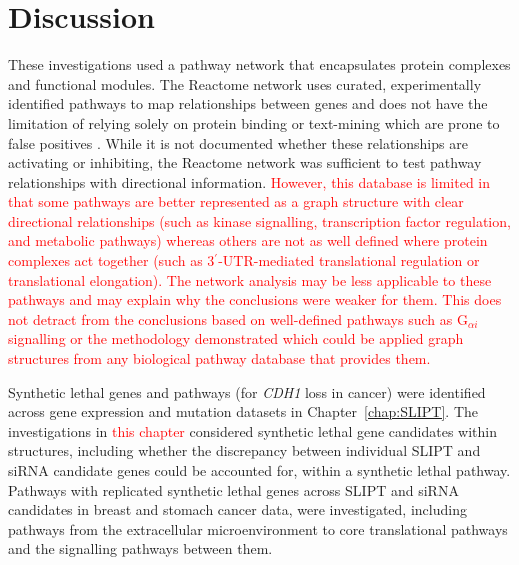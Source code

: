 \FloatBarrier

\section{Discussion}

These investigations used a \gls{pathway} network that encapsulates protein complexes and functional modules. The Reactome network uses curated, experimentally identified \glspl{pathway} to map relationships between genes and does not have the limitation of relying solely on protein binding or text-mining which are prone to false positives \citep{Reactome}. While it is not documented whether these relationships are activating or inhibiting, the Reactome network \citep{Reactome} was sufficient to test \gls{pathway} relationships with directional information.
\textcolor{red}{
However, this database is limited in that some pathways are better represented as a graph structure with clear directional relationships (such as kinase signalling, transcription factor regulation, and metabolic pathways) whereas others are not as well defined where protein complexes act together (such as 3$^\prime$-UTR-mediated translational regulation or translational elongation). The network analysis may be less applicable to these pathways and may explain why the conclusions were weaker for them. This does not detract from the conclusions based on well-defined pathways such as G$_{\alpha i}$ signalling or the methodology demonstrated which could be applied graph structures from any biological pathway database that provides them.
}

Synthetic lethal genes and \glspl{pathway} (for \textit{CDH1} loss in cancer) were identified across \gls{gene expression} and \gls{mutation} datasets in Chapter~\ref{chap:SLIPT}.
The investigations in \textcolor{red}{this chapter} considered \gls{synthetic lethal} gene candidates within  structures, including whether the discrepancy between individual \gls{SLIPT} and \gls{siRNA} candidate genes could be accounted for, within a \gls{synthetic lethal} \gls{pathway}.
%
Pathways with replicated \gls{synthetic lethal} genes across \gls{SLIPT} and \gls{siRNA} candidates in breast and stomach cancer data, were investigated, including \glspl{pathway} from the extracellular microenvironment to core translational \glspl{pathway} and the signalling \glspl{pathway} between them.

